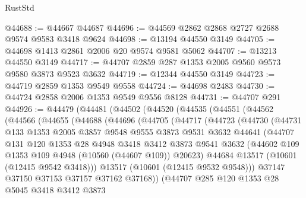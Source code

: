\begin{lexlean}{RustStd}
\begin{coremodule}
@44688 := @44667 @44687
@44696 := @44569 @2862 @2868 @2727 @2688 @9574 @9583 @3418 @9624
@44698 := @13194 @44550 @3149
@44705 := @44698 @1413 @2861 @2006 @20 @9574 @9581 @5062
@44707 := @13213 @44550 @3149
@44717 := @44707 @2859 @287 @1353 @2005 @9560 @9573 @9580 @3873 @9523 @3632
@44719 := @12344 @44550 @3149
@44723 := @44719 @2859 @1353 @9549 @9558
@44724 := @44698 @2483
@44730 := @44724 @2858 @2006 @1353 @9549 @9556 @8128
@44731 := @44707 @291
@44926 := @44479
    (@44481
      (@44502
        (@44520
          (@44535
            (@44551
              (@44562
                (@44566
                  (@44655
                    (@44688
                      (@44696
                        (@44705
                          (@44717
                            (@44723
                              (@44730
                                (@44731
                                  @133
                                  @1353
                                  @2005
                                  @3857
                                  @9548
                                  @9555
                                  @3873
                                  @9531
                                  @3632
                                  @44641
                                  (@44707
                                    @131
                                    @120
                                    @1353
                                    @28
                                    @4948
                                    @3418
                                    @3412
                                    @3873
                                    @9541
                                    @3632
                                    (@44602 @109 @1353 @109 @4948 (@10560 (@44607 @109)) @20623)
                                    @44684
                                    @13517
                                    (@10601 (@12415 @9542 @3418)))
                                  @13517
                                  (@10601 (@12415 @9532 @9548)))
                                @37147
                                @37150
                                @37153
                                @37157
                                @37162
                                @37168))
                            (@44707
                              @285
                              @120
                              @1353
                              @28
                              @5045
                              @3418
                              @3412
                              @3873

\end{coremodule}
\end{lexlean}
